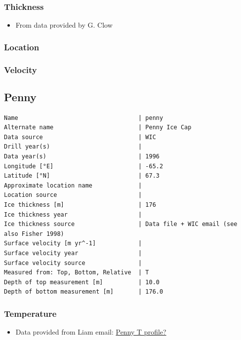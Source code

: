 \documentclass[article,a4paper,times,11pt,twoside]{article}
\begin{document}
\subsubsection{Thickness}
\label{sec:orgd1b6922}

\begin{itemize}
\item From data provided by G. Clow
\end{itemize}

\subsubsection{Location}
\label{sec:orga6730a4}

\subsubsection{Velocity}
\label{sec:org4cdeeac}
\clearpage
\subsection{Penny}
\label{sec:org124cb3b}
\begin{verbatim}
Name                                  | penny
Alternate name                        | Penny Ice Cap
Data source                           | WIC
Drill year(s)                         | 
Data year(s)                          | 1996
Longitude [°E]                        | -65.2
Latitude [°N]                         | 67.3
Approximate location name             | 
Location source                       | 
Ice thickness [m]                     | 176
Ice thickness year                    | 
Ice thickness source                  | Data file + WIC email (see also Fisher 1998)
Surface velocity [m yr^-1]            | 
Surface velocity year                 | 
Surface velocity source               | 
Measured from: Top, Bottom, Relative  | T
Depth of top measurement [m]          | 10.0
Depth of bottom measurement [m]       | 176.0
\end{verbatim}

\subsubsection{Temperature}
\label{sec:org9e96a0e}

\begin{itemize}
\item Data provided from Liam email: \href{msgid:AM0PR04MB6129F2DC55EE1ACDB5107ED5A2CC0@AM0PR04MB6129.eurprd04.prod.outlook.com}{Penny T profile?}
\end{itemize}
\end{document}
